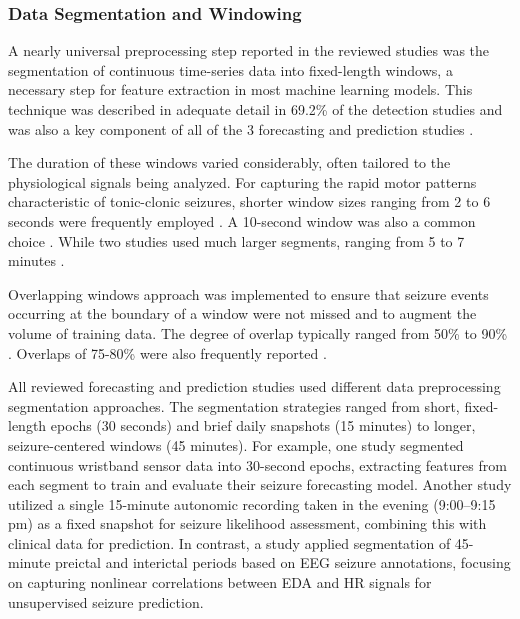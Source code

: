 \subsubsection{Data Segmentation and Windowing}
A nearly universal preprocessing step reported in the reviewed studies was the segmentation of continuous time-series data into fixed-length windows, a necessary step for feature extraction in most machine learning models. This technique was described in adequate detail in 69.2\% of the detection studies \cite{Milosevic2016-ee, De_Cooman2018-pq, Cogan2017-lg, Hamlin2021-sd, Wang2022-lt, Poh2012-af, Wu2024-yl, Nasseri2021-xn, Vakilna2024-hk, Larsen2024-vn, Dong2022-oo, Li2022-ty, Xu2022-tx, Wang2025-ql, Jiang2022-zu, Wang2025-my, Hegarty-Craver2021-hk, Chowdhury2022-bi} and was also a key component of all of the 3 forecasting and prediction studies \cite{Meisel2020-ii, Vieluf2023-zv, Vieluf2023-ta}.

The duration of these windows varied considerably, often tailored to the physiological signals being analyzed. For capturing the rapid motor patterns characteristic of tonic-clonic seizures, shorter window sizes ranging from 2 to 6 seconds were frequently employed \cite{Milosevic2016-ee, De_Cooman2018-pq, Dong2022-oo, Cogan2017-lg, Hamlin2021-sd, Wu2024-yl, Xu2022-tx, Wang2025-ql, Wang2025-my}. A 10-second window was also a common choice \cite{Poh2012-af, Nasseri2021-xn, Larsen2024-vn, Li2022-ty}. While two studies used much larger segments, ranging from 5 to 7 minutes \cite{Jiang2022-zu, Vakilna2024-hk}.

Overlapping windows approach was implemented to ensure that seizure events occurring at the boundary of a window were not missed and to augment the volume of training data. The degree of overlap typically ranged from 50\% \cite{Hamlin2021-sd, Dong2022-oo, Wang2025-ql, Vakilna2024-hk} to 90\% \cite{Wang2022-lt, Larsen2024-vn}. Overlaps of 75-80\% were also frequently reported \cite{Milosevic2016-ee, De_Cooman2018-pq, Cogan2017-lg, Poh2012-af, Wu2024-yl, Jiang2022-zu}.

All reviewed forecasting and prediction studies used different data preprocessing segmentation approaches. The segmentation strategies ranged from short, fixed-length epochs (30 seconds) and brief daily snapshots (15 minutes) to longer, seizure-centered windows (45 minutes). For example, one study \cite{Meisel2020-ii} segmented continuous wristband sensor data into 30-second epochs, extracting features from each segment to train and evaluate their seizure forecasting model. Another study \cite{Vieluf2023-zv} utilized a single 15-minute autonomic recording taken in the evening (9:00–9:15 pm) as a fixed snapshot for seizure likelihood assessment, combining this with clinical data for prediction. In contrast, a study \cite{Vieluf2023-ta} applied segmentation of 45-minute preictal and interictal periods based on EEG seizure annotations, focusing on capturing nonlinear correlations between EDA and HR signals for unsupervised seizure prediction.


